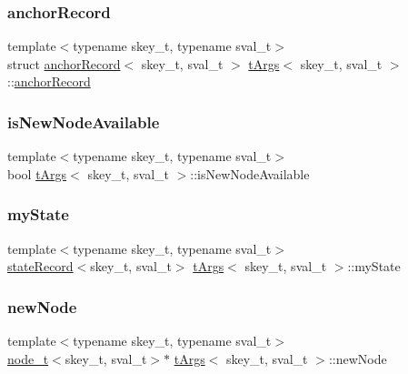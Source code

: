 \subsubsection{\texorpdfstring{anchor\+Record}{anchorRecord}}
{\footnotesize\ttfamily template$<$typename skey\+\_\+t, typename sval\+\_\+t$>$ \\
struct \hyperlink{structanchorRecord}{anchor\+Record}$<$ skey\+\_\+t, sval\+\_\+t $>$ \hyperlink{structtArgs}{t\+Args}$<$ skey\+\_\+t, sval\+\_\+t $>$\+::\hyperlink{structanchorRecord}{anchor\+Record}}

\mbox{\label{structtArgs_a0aa04a92450593265c01c6ecbb15ac59}} 
\subsubsection{\texorpdfstring{is\+New\+Node\+Available}{isNewNodeAvailable}}
{\footnotesize\ttfamily template$<$typename skey\+\_\+t, typename sval\+\_\+t$>$ \\
bool \hyperlink{structtArgs}{t\+Args}$<$ skey\+\_\+t, sval\+\_\+t $>$\+::is\+New\+Node\+Available}

\mbox{\label{structtArgs_af2580d3ccc03992847f75b823502e0d0}} 
\subsubsection{\texorpdfstring{my\+State}{myState}}
{\footnotesize\ttfamily template$<$typename skey\+\_\+t, typename sval\+\_\+t$>$ \\
\hyperlink{structstateRecord}{state\+Record}$<$skey\+\_\+t, sval\+\_\+t$>$ \hyperlink{structtArgs}{t\+Args}$<$ skey\+\_\+t, sval\+\_\+t $>$\+::my\+State}

\mbox{\label{structtArgs_a7051ff5a92464af6e2dddd17d944d7da}} 
\subsubsection{\texorpdfstring{new\+Node}{newNode}}
{\footnotesize\ttfamily template$<$typename skey\+\_\+t, typename sval\+\_\+t$>$ \\
\hyperlink{structnode__t}{node\+\_\+t}$<$skey\+\_\+t, sval\+\_\+t$>$$\ast$ \hyperlink{structtArgs}{t\+Args}$<$ skey\+\_\+t, sval\+\_\+t $>$\+::new\+Node}

